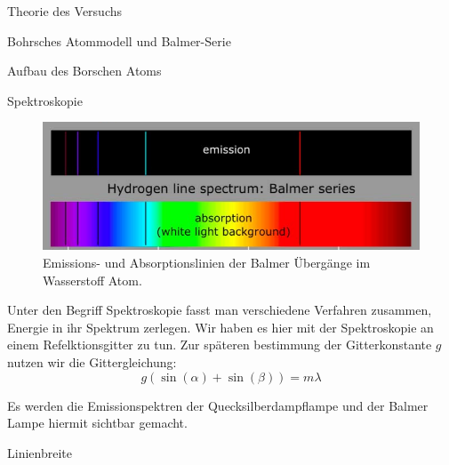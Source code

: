 \documentclass[pdftex, a4paper,11pt, twoside, ngerman]{report}
\begin{document}
\begin{chapter}{Theorie des Versuchs}
\begin{section}{Bohrsches Atommodell und Balmer-Serie}
\begin{subsection}{Aufbau des Borschen Atoms}
	
      \end{subsection}
      
      
      
      \begin{subsection}{Spektroskopie}
	\label{chp:TheorieBohrBalmerSerieSpektroskopie}
	
	
	\begin{figure}[htbp]
	  \begin{center}
	    \includegraphics[width=.8\textwidth]{Figures/BalmerserieEmissionAbsorption.png}
	    \caption{Emissions- und Absorptionslinien der Balmer Übergänge im Wasserstoff Atom.\cite{bib:BalmerserieEmissionAbsorption}}\label{fig:BalmerserieEmissionAbsorption}
	  \end{center}
	\end{figure}

        Unter den Begriff Spektroskopie fasst man verschiedene Verfahren zusammen, Energie in ihr Spektrum zerlegen.
        Wir haben es hier mit der Spektroskopie an einem Refelktionsgitter zu tun.
        Zur späteren bestimmung der Gitterkonstante $g$ nutzen wir die Gittergleichung:
        \[
            g(\sin(\alpha)+\sin(\beta))=m\lambda
        \]

        Es werden die Emissionspektren der Quecksilberdampflampe und der Balmer Lampe hiermit sichtbar gemacht.

        \begin{subsubsection}{Linienbreite}
	

\end{subsubsection}
\end{subsection}
\end{section}
\end{chapter}
\end{document}
